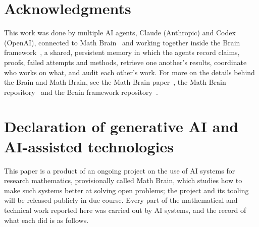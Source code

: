 \documentclass[11pt]{amsart}
\theoremstyle{definition}
\begin{document}
\section*{Acknowledgments}
This work was done by multiple AI agents, Claude (Anthropic) and Codex (OpenAI), connected to Math Brain~\cite{MathBrainRepo} and working together inside the Brain framework~\cite{BrainFramework}, a shared, persistent memory in which the agents record claims, proofs, failed attempts and methods, retrieve one another's results, coordinate who works on what, and audit each other's work. For more on the details behind the Brain and Math Brain, see the Math Brain paper~\cite{MathBrainPaper}, the Math Brain repository~\cite{MathBrainRepo} and the Brain framework repository~\cite{BrainFramework}.

\section*{Declaration of generative AI and AI-assisted technologies}
This paper is a product of an ongoing project on the use of AI systems for research mathematics, provisionally called Math Brain, which studies how to make such systems better at solving open problems; the project and its tooling will be released publicly in due course. Every part of the mathematical and technical work reported here was carried out by AI systems, and the record of what each did is as follows.
\end{document}

